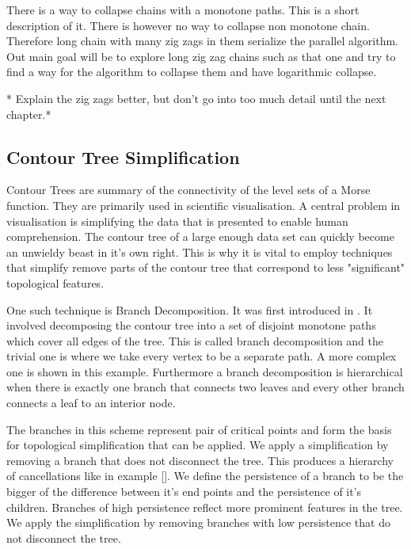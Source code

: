 There is a way to collapse chains with a monotone paths. This is a short description of it. There is however no way to collapse non monotone chain. Therefore long chain with many zig zags in them serialize the parallel algorithm. Out main goal will be to explore long zig zag chains such as that one and try to find a way for the algorithm to collapse them and have logarithmic collapse.

* Explain the zig zags better, but don't go into too much detail until the next chapter.*

\subsection{Contour Tree Simplification}

Contour Trees are summary of the connectivity of the level sets of a Morse function. They are primarily used in scientific visualisation. A central problem in visualisation is simplifying the data that is presented to enable human comprehension. The contour tree of a large enough data set can quickly become an unwieldy beast in it's own right. This is why it is vital to employ techniques that simplify remove parts of the contour tree that correspond to less "significant" topological features.

One such technique is Branch Decomposition. It was first introduced in \cite{ct-branch-decomp}. It involved decomposing the contour tree into a set of disjoint monotone paths which cover all edges of the tree. This is called branch decomposition and the trivial one is where we take every vertex to be a separate path. A more complex one is shown in this example. Furthermore a branch decomposition is hierarchical when there is exactly one branch that connects two leaves and every other branch connects a leaf to an interior node.

The branches in this scheme represent pair of critical points and form the basis for topological simplification that can be applied. We apply a simplification by removing a branch that does not disconnect the tree. This produces a hierarchy of cancellations like in example []. We define the persistence of a branch to be the bigger of the difference between it's end points and the persistence of it's children. Branches of high persistence reflect more prominent features in the tree. We apply the simplification by removing branches with low persistence that do not disconnect the tree.



